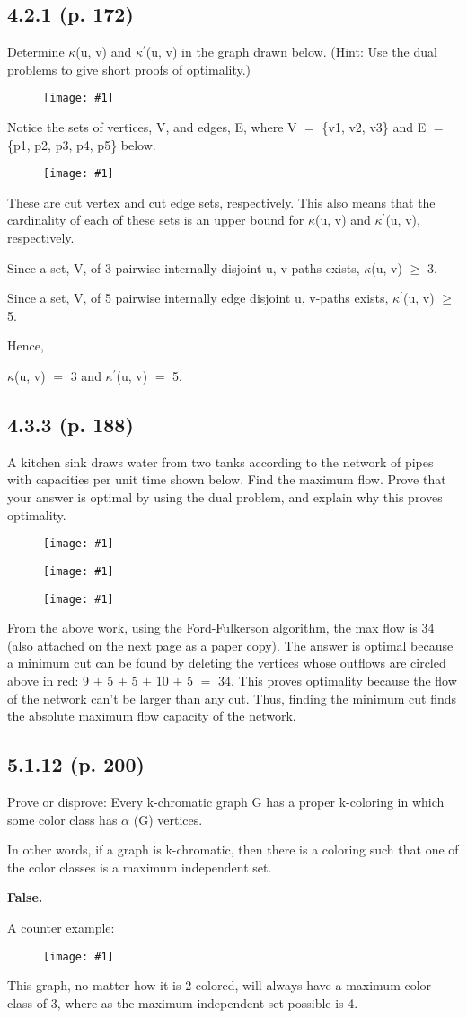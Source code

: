 \documentclass{article}
\newcommand{\mt}[1]{\ensuremath{#1}}
\newcommand\ssc[2][\DefaultOpt]{%
  \def\DefaultOpt{#2}%
  \subsection[#1]{#2}%
}
\newcommand{\afa}{\mt{\alpha} }
\newcommand{\bk}[1]{\{#1\}}
\newcommand{\ps}{\mt{\operatorname{+}} }
\newcommand{\gre}{\mt{\operatorname{\geq}} }
\newcommand{\eql}{ \mt{\operatorname{=}} }
\newcommand{\pr}{\mt{^\prime} } 		   %
\newcommand{\img}[1]{
\begin{figure}[h]
  \texttt{[image: \#1]}
\end{figure}
}
\newcommand{\simg}[1]{
\begin{figure}[h]
  \texttt{[image: \#1]}
\end{figure}
}
\begin{document}
\newpage

\ssc{4.2.1 (p. 172)}{

Determine $\kappa$(u, v) and $\kappa\pr$(u, v) in the graph drawn below. (Hint: Use the dual problems to give short proofs of optimality.)

\img{GTHW5421}

Notice the sets of vertices, V, and edges, E, where V \eql \bk{v1, v2, v3} and E \eql \bk{p1, p2, p3, p4, p5} below.

\img{GTHW54212}

These are cut vertex and cut edge sets, respectively. This also means that the cardinality of each of these sets is an upper bound for $\kappa$(u, v) and $\kappa\pr$(u, v), respectively.

Since a set, V, of 3 pairwise internally disjoint u, v-paths exists, $\kappa$(u, v) \gre 3.

Since a set, V, of 5 pairwise internally edge disjoint u, v-paths exists, $\kappa\pr$(u, v) \gre 5.

Hence,

$\kappa$(u, v) \eql 3 and $\kappa\pr$(u, v) \eql 5.

}

\newpage

\ssc{4.3.3 (p. 188)}{

A kitchen sink draws water from two tanks according to the network of pipes with capacities per unit time shown below. Find the maximum flow. Prove that your answer is optimal by using the dual problem, and explain why this proves optimality.

\simg{GTHW5433}

\img{GTHW54332}

\simg{GTHW54333}


From the above work, using the Ford-Fulkerson algorithm, the max flow is 34 (also attached on the next page as a paper copy). The answer is optimal because a minimum cut can be found by deleting the vertices whose outflows are circled above in red: 9 \ps 5 \ps 5 \ps 10 \ps 5 \eql 34. This proves optimality because the flow of the network can't be larger than any cut. Thus, finding the minimum cut finds the absolute maximum flow capacity of the network.

}

\newpage

\ssc{5.1.12 (p. 200)}{

Prove or disprove: Every k-chromatic graph G has a proper k-coloring in which some color class has \afa(G) vertices.

In other words, if a graph is k-chromatic, then there is a coloring such that one of the color classes is a maximum independent set.

\textbf{False.}

A counter example:

\img{GTHW55121}

This graph, no matter how it is 2-colored, will always have a maximum color class of 3, where as the maximum independent set possible is 4.
}
\end{document}
